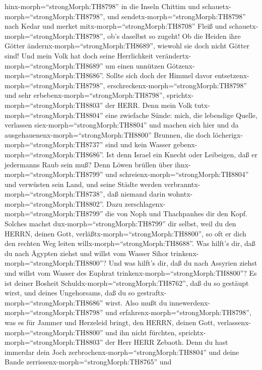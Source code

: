hinx-morph=``strongMorph:TH8798'' in die Inseln Chittim und
schauetx-morph=``strongMorph:TH8798'', und
sendetx-morph=``strongMorph:TH8798'' nach Kedar und merket
mitx-morph=``strongMorph:TH8708'' Fleiß und
schauetx-morph=``strongMorph:TH8798'', ob's daselbst so zugeht!
 Ob die Heiden ihre Götter
ändernx-morph=``strongMorph:TH8689'', wiewohl sie doch nicht Götter
sind! Und mein Volk hat doch seine Herrlichkeit
verändertx-morph=``strongMorph:TH8689'' um einen unnützen
Götzenx-morph=``strongMorph:TH8686''.  Sollte sich doch der
Himmel davor entsetzenx-morph=``strongMorph:TH8798'',
erschreckenx-morph=``strongMorph:TH8798'' und sehr
erbebenx-morph=``strongMorph:TH8798'',
sprichtx-morph=``strongMorph:TH8803'' der HERR.  Denn mein
Volk tutx-morph=``strongMorph:TH8804'' eine zwiefache Sünde: mich, die
lebendige Quelle, verlassen siex-morph=``strongMorph:TH8804'' und machen
sich hier und da ausgehauenenx-morph=``strongMorph:TH8800'' Brunnen, die
doch löcherigx-morph=``strongMorph:TH8737'' sind und kein Wasser
gebenx-morph=``strongMorph:TH8686''.  Ist denn Israel ein
Knecht oder Leibeigen, daß er jedermanns Raub sein muß? 
Denn Löwen brüllen über ihnx-morph=``strongMorph:TH8799'' und
schreienx-morph=``strongMorph:TH8804'' und verwüsten sein Land, und
seine Städte werden verbranntx-morph=``strongMorph:TH8738'', daß niemand
darin wohntx-morph=``strongMorph:TH8802''.  Dazu
zerschlagenx-morph=``strongMorph:TH8799'' die von Noph und Thachpanhes
dir den Kopf.  Solches machst
dux-morph=``strongMorph:TH8799'' dir selbst, weil du den HERRN, deinen
Gott, verläßtx-morph=``strongMorph:TH8800'', so oft er dich den rechten
Weg leiten willx-morph=``strongMorph:TH8688''.  Was hilft's
dir, daß du nach Ägypten ziehst und willst vom Wasser Sihor
trinkenx-morph=``strongMorph:TH8800''? Und was hilft's dir, daß du nach
Assyrien ziehst und willst vom Wasser des Euphrat
trinkenx-morph=``strongMorph:TH8800''?  Es ist deiner
Bosheit Schuldx-morph=``strongMorph:TH8762'', daß du so gestäupt wirst,
und deines Ungehorsams, daß du so gestraftx-morph=``strongMorph:TH8686''
wirst. Also mußt du innewerdenx-morph=``strongMorph:TH8798'' und
erfahrenx-morph=``strongMorph:TH8798'', was es für Jammer und Herzeleid
bringt, den HERRN, deinen Gott, verlassenx-morph=``strongMorph:TH8800''
und ihn nicht fürchten, sprichtx-morph=``strongMorph:TH8803'' der Herr
HERR Zebaoth.  Denn du hast immerdar dein Joch
zerbrochenx-morph=``strongMorph:TH8804'' und deine Bande
zerrissenx-morph=``strongMorph:TH8765'' und
